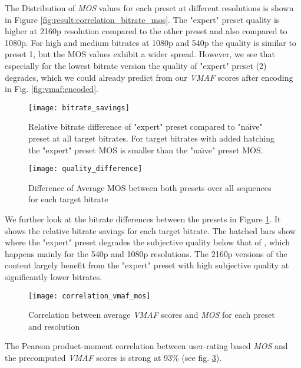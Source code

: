 The Distribution of \textit{MOS} values for each preset at different resolutions is shown in Figure \ref{fig:result:correlation_bitrate_mos}.
The "expert" preset quality is higher at 2160p resolution compared to the other preset and also compared to 1080p. For high and medium bitrates at 1080p and 540p the quality is similar to preset 1, but the MOS values exhibit a wider spread.
However, we see that especially for the lowest bitrate version the quality of "expert" preset (2) degrades, which we could already predict from our \textit{VMAF} scores after encoding in Fig. \ref{fig:vmaf:encoded}.

\begin{figure}[htb!]
	\centering
	\texttt{[image: bitrate\_savings]}
	\caption{Relative bitrate difference of "expert" preset compared to "na\"{\i}ve" preset at all target bitrates. For target bitrates with added hatching the "expert" preset MOS is smaller than the "na\"{\i}ve" preset MOS.}
	\label{fig:result:bitrate_savings}
\end{figure}
\begin{figure}[htb!]
	\centering
	\texttt{[image: quality\_difference]}
	\caption{Difference of Average MOS between both presets over all sequences for each target bitrate}
	\label{fig:result:quality_difference}
\end{figure}

We further look at the bitrate differences between the presets in Figure \ref{fig:result:bitrate_savings}. It shows the relative bitrate savings for each target bitrate. The hatched bars show where the "expert" preset degrades the subjective quality below that of , which happens mainly for the 540p and 1080p resolutions. The 2160p versions of the content largely benefit from the "expert" preset with high subjective quality at significantly lower bitrates.


\begin{figure}[htb!]
	\centering
	\texttt{[image: correlation\_vmaf\_mos]}
	\caption{Correlation between average \textit{VMAF} scores and \textit{MOS} for each preset and resolution}
	\label{fig:result:correlation_vmaf_mos}
\end{figure}

The Pearson product-moment correlation between user-rating based \textit{MOS} and the precomputed \textit{VMAF} scores is strong at 93\% (see fig. \ref{fig:result:correlation_vmaf_mos}).
\\
